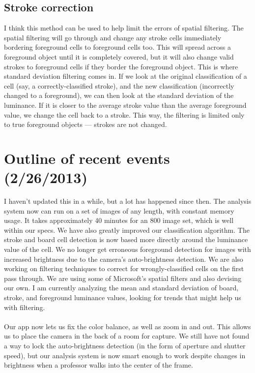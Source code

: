 \documentclass[]{article}
\begin{document}
	\subsection*{Stroke correction}
		I think this method can be used to help limit the errors of spatial filtering.  The spatial filtering will go through and change any stroke cells immediately bordering foreground cells to foreground cells too.  This will spread across a foreground object until it is completely covered, but it will also change valid strokes to foreground cells if they border the foreground object. This is where standard deviation filtering comes in.  If we look at the original classification of a cell (say, a correctly-classified stroke), and the new classification (incorrectly changed to a foreground), we can then look at the standard deviation of the luminance.  If it is closer to the average stroke value than the average foreground value, we change the cell back to a stroke.  This way, the filtering is limited only to true foreground objects --- strokes are not changed.
	
	\section{Outline of recent events (2/26/2013)}
		I haven't updated this in a while, but a lot has happened since then.  The analysis system now can run on a set of images of any length, with constant memory usage.  It takes approximately 40 minutes for an 800 image set, which is well within our specs.  We have also greatly improved our classification algorithm.  The stroke and board cell detection is now based more directly around the luminance value of the cell.  We no longer get erroneous foreground detection for images with increased brightness due to the camera's auto-brightness detection.  We are also working on filtering techniques to correct for wrongly-classified cells on the first pass through.  We are using some of Microsoft's spatial filters and also devising our own.  I am currently analyzing the mean and standard deviation of board, stroke, and foreground luminance values, looking for trends that might help us with filtering.   \\ \\  Our app now lets us fix the color balance, as well as zoom in and out.  This allows us to place the camera in the back of a room for capture. We still have not found a way to lock the auto-brightness detection (in the form of aperture and shutter speed), but our analysis system is now smart enough to work despite changes in brightness when a professor walks into the center of the frame.
		
\end{document}
